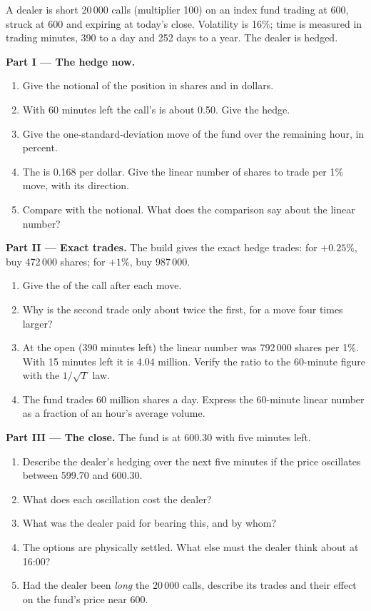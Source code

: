 \begin{problem}\label{pb:m1:zero-day-options-and-retail-flow:1}
A dealer is short 20\,000 calls (multiplier 100) on an index fund trading at
600, struck at 600 and expiring at today's close. Volatility is 16\%; time is
measured in trading minutes, 390 to a day and 252 days to a year. The dealer
is  hedged.

\medskip\noindent\textbf{Part I --- The hedge now.}
\begin{enumerate}
\item Give the notional of the position in shares and in dollars.
\item With 60 minutes left the call's  is about 0.50. Give the hedge.
\item Give the one-standard-deviation move of the fund over the remaining
hour, in percent.
\item The  is 0.168 per dollar. Give the linear number of shares to
trade per 1\% move, with its direction.
\item Compare with the notional. What does the comparison say about the
linear number?
\end{enumerate}

\medskip\noindent\textbf{Part II --- Exact trades.}
The build gives the exact hedge trades: for $+0.25\%$, buy 472\,000 shares; for
$+1\%$, buy 987\,000.
\begin{enumerate}[resume]
\item Give the  of the call after each move.
\item Why is the second trade only about twice the first, for a move four
times larger?
\item At the open (390 minutes left) the linear number was 792\,000 shares
per 1\%. With 15 minutes left it is 4.04 million. Verify the ratio to the
60-minute figure with the $1/\sqrt T$ law.
\item The fund trades 60 million shares a day. Express the 60-minute linear
number as a fraction of an hour's average volume.
\end{enumerate}

\medskip\noindent\textbf{Part III --- The close.}
The fund is at 600.30 with five minutes left.
\begin{enumerate}[resume]
\item Describe the dealer's hedging over the next five minutes if the price
oscillates between 599.70 and 600.30.
\item What does each oscillation cost the dealer?
\item What was the dealer paid for bearing this, and by whom?
\item The options are physically settled. What else must the dealer think
about at 16:00?
\item Had the dealer been \emph{long} the 20\,000 calls, describe its trades
and their effect on the fund's price near 600.
\end{enumerate}


\end{problem}
